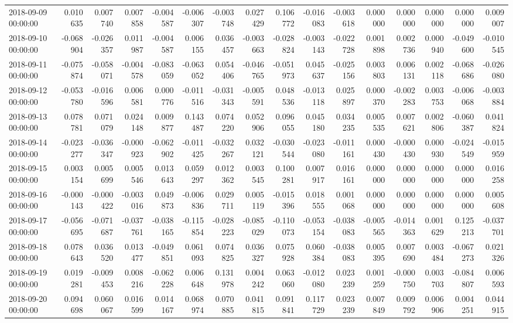 \begin{tabular}{lrrrrrrrrrrrrrrr}
2018-09-09 00:00:00 & 0.010635 & 0.007740 & 0.007858 & -0.004587 & -0.006307 & -0.003748 & 0.027429 & 0.106772 & -0.016083 & -0.003618 & 0.000000 & 0.000000 & 0.000000 & 0.000000 & 0.009007 \\
2018-09-10 00:00:00 & -0.068904 & -0.026357 & 0.011987 & -0.004587 & 0.006155 & 0.036457 & -0.003663 & -0.028824 & -0.003143 & -0.022728 & 0.001898 & 0.002736 & 0.000940 & -0.049600 & -0.010545 \\
2018-09-11 00:00:00 & -0.075874 & -0.058071 & -0.004578 & -0.083059 & -0.063052 & 0.054406 & -0.046765 & -0.051973 & 0.045637 & -0.025156 & 0.003803 & 0.006131 & 0.002118 & -0.068686 & -0.026080 \\
2018-09-12 00:00:00 & -0.053780 & -0.016596 & 0.006581 & 0.000776 & -0.011516 & -0.031343 & -0.005591 & 0.048536 & -0.013118 & 0.025897 & 0.000370 & -0.002283 & 0.003753 & -0.006068 & -0.003884 \\
2018-09-13 00:00:00 & 0.078781 & 0.071079 & 0.024148 & 0.009877 & 0.143487 & 0.074220 & 0.052906 & 0.096055 & 0.045180 & 0.034235 & 0.005535 & 0.007621 & 0.002806 & -0.060387 & 0.041824 \\
2018-09-14 00:00:00 & -0.023277 & -0.036347 & -0.000923 & -0.062902 & -0.011425 & -0.032267 & 0.032121 & -0.030544 & -0.023080 & -0.011161 & 0.000430 & -0.000430 & 0.000930 & -0.024549 & -0.015959 \\
2018-09-15 00:00:00 & 0.003154 & 0.005699 & 0.005546 & 0.013643 & 0.059297 & 0.012362 & 0.003545 & 0.100281 & 0.007917 & 0.016161 & 0.000000 & 0.000000 & 0.000000 & 0.000000 & 0.016258 \\
2018-09-16 00:00:00 & -0.000143 & -0.000422 & -0.003016 & 0.049873 & -0.006836 & 0.029711 & 0.005119 & -0.015396 & 0.018555 & 0.001068 & 0.000000 & 0.000000 & 0.000000 & 0.000000 & 0.005608 \\
2018-09-17 00:00:00 & -0.056695 & -0.071687 & -0.037761 & -0.038165 & -0.115854 & -0.028223 & -0.085029 & -0.110073 & -0.053154 & -0.038083 & -0.005565 & -0.014363 & 0.001629 & 0.125213 & -0.037701 \\
2018-09-18 00:00:00 & 0.078643 & 0.036520 & 0.013477 & -0.049851 & 0.061093 & 0.074825 & 0.036327 & 0.075928 & 0.060384 & -0.038083 & 0.005395 & 0.007690 & 0.003484 & -0.067273 & 0.021326 \\
2018-09-19 00:00:00 & 0.019281 & -0.009453 & 0.008216 & -0.062228 & 0.006648 & 0.131978 & 0.004242 & 0.063060 & -0.012080 & 0.023239 & 0.001259 & -0.000750 & 0.003703 & -0.084807 & 0.006593 \\
2018-09-20 00:00:00 & 0.094698 & 0.060067 & 0.016599 & 0.014167 & 0.068974 & 0.070885 & 0.041815 & 0.091841 & 0.117729 & 0.023239 & 0.007849 & 0.009792 & 0.006906 & 0.004251 & 0.044915 \\

\end{tabular}
